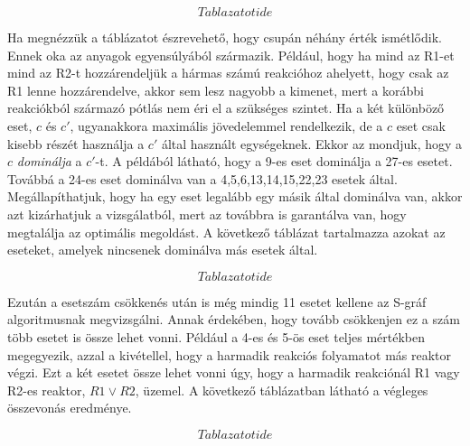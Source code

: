$$Tablazatot ide $$

Ha megnézzük a táblázatot észrevehető, hogy csupán néhány érték ismétlődik. Ennek oka az anyagok egyensúlyából származik. Például, hogy ha mind az R1-et mind az R2-t hozzárendeljük a hármas számú reakcióhoz ahelyett, hogy csak az R1 lenne hozzárendelve, akkor sem lesz nagyobb a kimenet, mert a korábbi reakciókból származó pótlás nem éri el a szükséges szintet. Ha a két különböző eset, $c$ és $c'$, ugyanakkora maximális jövedelemmel rendelkezik, de a $c$ eset csak kisebb részét használja a $c'$ által használt egységeknek. Ekkor az mondjuk, hogy a $c$ \textit{dominálja} a $c'$-t. A példából látható, hogy a 9-es eset dominálja a 27-es esetet. Továbbá a 24-es eset dominálva van a 4,5,6,13,14,15,22,23 esetek által. Megállapíthatjuk, hogy ha egy eset legalább egy másik által dominálva van, akkor azt kizárhatjuk a vizsgálatból, mert az továbbra is garantálva van, hogy megtalálja az optimális megoldást. A következő táblázat tartalmazza azokat az eseteket, amelyek nincsenek dominálva más esetek által. 	

$$Tablazatot ide $$

Ezután a esetszám csökkenés után is még mindig 11 esetet kellene az S-gráf algoritmusnak megvizsgálni. Annak érdekében, hogy tovább csökkenjen ez a szám több esetet is össze lehet vonni. Például a 4-es és 5-ös eset teljes mértékben megegyezik, azzal a kivétellel, hogy a harmadik reakciós folyamatot más reaktor végzi. Ezt a két esetet össze lehet vonni úgy, hogy a harmadik reakciónál R1 vagy R2-es reaktor, $R1 \vee R2$, üzemel. A következő táblázatban látható a végleges összevonás eredménye.

$$Tablazatot ide $$




